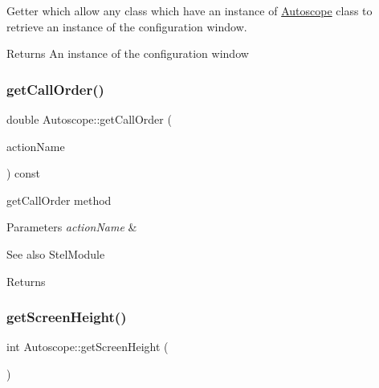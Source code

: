 Getter which allow any class which have an instance of \mbox{\hyperlink{class_autoscope}{Autoscope}} class to retrieve an instance of the configuration window. 

\begin{DoxyReturn}{Returns}
An instance of the configuration window 
\end{DoxyReturn}
\mbox{\label{class_autoscope_a9495317b6b710812825c40dbe7ddd458}} 
\subsubsection{\texorpdfstring{getCallOrder()}{getCallOrder()}}
{\footnotesize\ttfamily double Autoscope\+::get\+Call\+Order (\begin{DoxyParamCaption}\item[{Stel\+Module\+Action\+Name}]{action\+Name }\end{DoxyParamCaption}) const\hspace{0.3cm}{\ttfamily [virtual]}}



get\+Call\+Order method 


\begin{DoxyParams}{Parameters}
{\em action\+Name} & \\
\hline
\end{DoxyParams}
\begin{DoxySeeAlso}{See also}
Stel\+Module 
\end{DoxySeeAlso}
\begin{DoxyReturn}{Returns}

\end{DoxyReturn}
\mbox{\label{class_autoscope_adb579d1e5a23aaa401d5a93be033529d}} 
\subsubsection{\texorpdfstring{getScreenHeight()}{getScreenHeight()}}
{\footnotesize\ttfamily int Autoscope\+::get\+Screen\+Height (\begin{DoxyParamCaption}\item[{void}]{ }\end{DoxyParamCaption})\hspace{0.3cm}{\ttfamily [inline]}}



